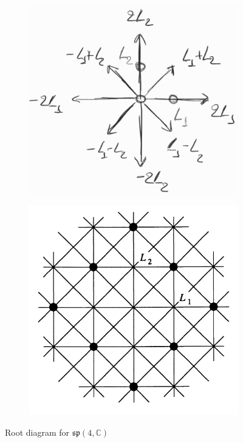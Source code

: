 \documentclass{report}
\begin{document}
\begin{figure}[h]
    \centering
    \begin{subfigure}[b]{0.4\textwidth}
        \centering
        \includegraphics[width=\textwidth]{root_diagram_sp(4,C).jpg}
    \end{subfigure}
    \hfill
    \begin{subfigure}[b]{0.4\textwidth}
        \centering
        \includegraphics[width=\textwidth]{root_diagram_sp_4_no labels.png}
    \end{subfigure}
    \label{fig:root_diagram_sp_4_C}
    \caption{Root diagram for $\mathfrak{sp}(4, \mathbb C)$}
\end{figure}
\end{document}
